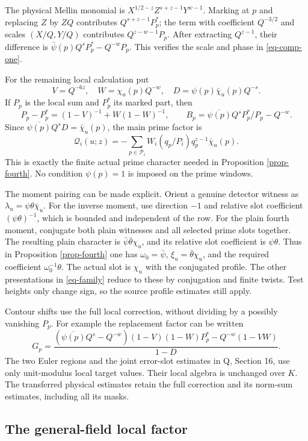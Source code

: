 \documentclass[11pt,a4paper]{article}
\theoremstyle{remark}\newtheorem{remark}[theorem]{Remark}
\newcommand{\Qcal}{\mathcal Q}
\numberwithin{equation}{section}
\begin{document}
The physical Mellin monomial is
$X^{1/2-z}Z^{s+z-1}Y^{w-1}$. Marking at $p$ and replacing
$Z$ by $ZQ$ contributes $Q^{s+z-1}P_p^*$; the term with
coefficient $Q^{-3/2}$ and scales $(X/Q,Y/Q)$ contributes
$Q^{z-w-1}P_p$. After extracting $Q^{z-1}$, their difference is
$\bar\psi(p)Q^sP_p^*-Q^{-w}P_p$. This verifies the scale
and phase in \eqref{eq-comp-one}.

For the remaining local calculation put
\[
 V=Q^{-6z},\quad W=\chi_u(p)Q^{-w},\quad
 D=\psi(p)\bar\chi_u(p)Q^{-s}.
\]
If $P_p$ is the local sum and $P_p^*$ its marked part, then
\[
 P_p-P_p^*=(1-V)^{-1}+W(1-W)^{-1},\qquad
 B_p=\overline{\psi(p)}Q^sP_p^*/P_p-Q^{-w}.
\]
Since $\overline{\psi(p)}Q^sD=\bar\chi_u(p)$,
the main prime factor is
\begin{equation}\label{eq-main-prime}
 \Qcal_i(u;z)=-\sum_{p\in\mathcal P_i}
       W_i(q_p/P_i)q_p^{z-1}\bar\chi_u(p).
\end{equation}
This is exactly the finite actual prime character needed in
Proposition \ref{prop-fourth}. No condition $\psi(p)=1$
is imposed on the prime windows.

The moment pairing can be made explicit. Orient a genuine
detector witness as $\lambda_u=\psi\theta\bar\chi_u$.
For the inverse moment, use direction $-1$ and relative slot
coefficient $(\psi\theta)^{-1}$, which is bounded and independent
of the row. For the plain fourth moment, conjugate both plain
witnesses and all selected prime slots together. The resulting
plain character is $\bar\psi\bar\theta\chi_u$, and its
relative slot coefficient is $\psi\theta$. Thus in Proposition
\ref{prop-fourth} one has $\omega_0=\bar\psi$,
$\xi_u=\bar\theta\chi_u$, and the required coefficient
$\omega_0^{-1}\theta$. The actual slot is $\chi_u$ with the
conjugated profile. The other presentations in \eqref{eq-family}
reduce to these by conjugation and finite twists. Test heights
only change sign, so the source profile estimates still apply.

Contour shifts use the full local correction, without dividing
by a possibly vanishing $P_p$. For example the replacement
factor can be written
\[
 G_p=\frac{
  (\overline{\psi(p)}Q^s-Q^{-w})(1-V)(1-W)P_p^*
              -Q^{-w}(1-VW)}{1-D}.
\]
The two Euler regions and the joint error-slot estimates in
Q, Section 16, use only unit-modulus local target values.
Their local algebra is unchanged over $K$. The transferred physical estimates retain the full correction
and its norm-sum estimates, including all its masks.

\subsection{The general-field local factor}
\end{document}
